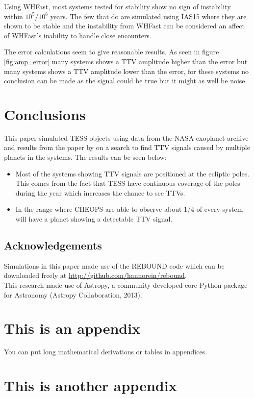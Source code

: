 \documentclass[12pt]{report}
\newcommand{\mnras}{MNRAS}
\newcommand{\aap}{A\&A}
\begin{document}
	Using WHFast, most systems tested for stability show no sign of instability within $10^5 / 10^6$ years. The few that do are simulated using IAS15 where they are shown to be stable and the instability from WHFast can be considered an affect of WHFast's inability to handle close encounters.
	
	The error calculations seem to give reasonable results. As seen in figure \ref{fig:amp_error} many systems shows a TTV amplitude higher than the error but many systems shows a TTV amplitude lower than the error, for these systems no conclusion can be made as the signal could be true but it might as well be noise.
\chapter{Conclusions}
	This paper simulated TESS objects using data from the NASA exoplanet archive and results from the paper by \cite{2015ApJ...809...77S} on a search to find TTV signals caused by multiple planets in the systems. The results can be seen below:
	\begin{itemize}
		\item Most of the systems showing TTV signals are positioned at the ecliptic poles. This comes from the fact that TESS have continuous coverage of the poles during the year which increases the chance to see TTVs.
		\item In the range where CHEOPS are able to observe about 1/4 of every system will have a planet showing a detectable TTV signal.
	\end{itemize}

\section*{Acknowledgements}

Simulations in this paper made use of the REBOUND code which can be downloaded freely at \url{http://github.com/hannorein/rebound}.\vspace{0.5cm}\\
This research made use of Astropy, a community-developed core Python package for Astronomy (Astropy Collaboration, 2013).

%




\begin{appendix}

\chapter{This is an appendix}
\label{ap:input_code}
You can put long mathematical derivations or tables in appendices.

\chapter{This is another appendix}

\end{appendix}
\end{document}
